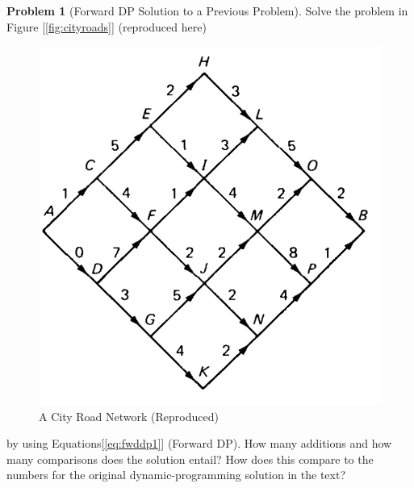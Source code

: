 \documentclass[english,notitlepage,smartquotes]{hgbreport}
\theoremstyle{definition}
\theoremstyle{definition}
\newtheorem{problem}{Problem}
\theoremstyle{remark}
\theoremstyle{definition}
\theoremstyle{plain}
\theoremstyle{definition}
\begin{document}
\begin{problem}[Forward DP Solution to a Previous Problem]
Solve the problem in Figure [\ref{fig:cityroads}] (reproduced here) 

\begin{figure}[H]
\centering
\includegraphics[width=.5\textwidth]{elem-path-problem-1}
\caption{A City Road Network (Reproduced)}
\label{fig:cityroadsrep}
\end{figure}

by using Equations[\ref{eq:fwddp1}] (Forward DP). How many additions and how many comparisons does the solution entail? How does this compare to the numbers for the original dynamic-programming solution in the text?
\end{problem}
\end{document}
